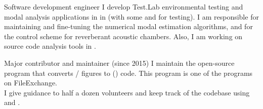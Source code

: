 \documentclass{cv-egeerardyn}
\begin{document}
\maketitle

\begin{experience}
  {Software development engineer}%
  {\lms}%
  {%
   I develop Test.Lab environmental testing and modal analysis applications in  in  (with some  and  for testing).
   I am responsible for maintaining and fine-tuning the numerical modal estimation algorithms, and for the control scheme for reverberant acoustic chambers.
   Also, I am working on source code analysis tools in .
  }

  {Major contributor and maintainer (since 2015)}%
  {\githubMatlabToTikz}{
  I maintain the open-source program  that converts / figures to  (\keyword{\LaTeX}) code.
  This program is one of the  programs on FileExchange.\\
  I give guidance to half a dozen volunteers and keep track of the codebase using  and .
  }

\end{experience}
\end{document}
